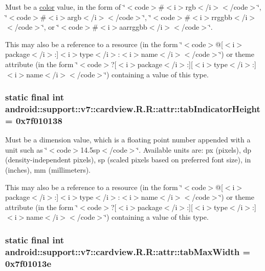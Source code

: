 Must be a \hyperlink{classandroid_1_1support_1_1v7_1_1cardview_1_1_r_1_1color}{color} value, in the form of \char`\"{}$<$code$>$\#$<$i$>$rgb$<$/i$>$$<$/code$>$\char`\"{}, \char`\"{}$<$code$>$\#$<$i$>$argb$<$/i$>$$<$/code$>$\char`\"{}, \char`\"{}$<$code$>$\#$<$i$>$rrggbb$<$/i$>$$<$/code$>$\char`\"{}, or \char`\"{}$<$code$>$\#$<$i$>$aarrggbb$<$/i$>$$<$/code$>$\char`\"{}. 

This may also be a reference to a resource (in the form \char`\"{}$<$code$>$@\mbox{[}$<$i$>$package$<$/i$>$:\mbox{]}$<$i$>$type$<$/i$>$:$<$i$>$name$<$/i$>$$<$/code$>$\char`\"{}) or theme attribute (in the form \char`\"{}$<$code$>$?\mbox{[}$<$i$>$package$<$/i$>$:\mbox{]}\mbox{[}$<$i$>$type$<$/i$>$:\mbox{]}$<$i$>$name$<$/i$>$$<$/code$>$\char`\"{}) containing a value of this type. \hypertarget{classandroid_1_1support_1_1v7_1_1cardview_1_1_r_1_1attr_944ede380c896317206baa4d5dc9ae8f}{
\subsubsection[{tabIndicatorHeight}]{\setlength{\rightskip}{0pt plus 5cm}static final int android::support::v7::cardview.R.R::attr::tabIndicatorHeight = 0x7f010138}}
\label{classandroid_1_1support_1_1v7_1_1cardview_1_1_r_1_1attr_944ede380c896317206baa4d5dc9ae8f}


Must be a dimension value, which is a floating point number appended with a unit such as \char`\"{}$<$code$>$14.5sp$<$/code$>$\char`\"{}. Available units are: px (pixels), dp (density-independent pixels), sp (scaled pixels based on preferred font size), in (inches), mm (millimeters). 

This may also be a reference to a resource (in the form \char`\"{}$<$code$>$@\mbox{[}$<$i$>$package$<$/i$>$:\mbox{]}$<$i$>$type$<$/i$>$:$<$i$>$name$<$/i$>$$<$/code$>$\char`\"{}) or theme attribute (in the form \char`\"{}$<$code$>$?\mbox{[}$<$i$>$package$<$/i$>$:\mbox{]}\mbox{[}$<$i$>$type$<$/i$>$:\mbox{]}$<$i$>$name$<$/i$>$$<$/code$>$\char`\"{}) containing a value of this type. \hypertarget{classandroid_1_1support_1_1v7_1_1cardview_1_1_r_1_1attr_62f0af42d2fe75c588e57253235d0551}{
\subsubsection[{tabMaxWidth}]{\setlength{\rightskip}{0pt plus 5cm}static final int android::support::v7::cardview.R.R::attr::tabMaxWidth = 0x7f01013e}}
\label{classandroid_1_1support_1_1v7_1_1cardview_1_1_r_1_1attr_62f0af42d2fe75c588e57253235d0551}



